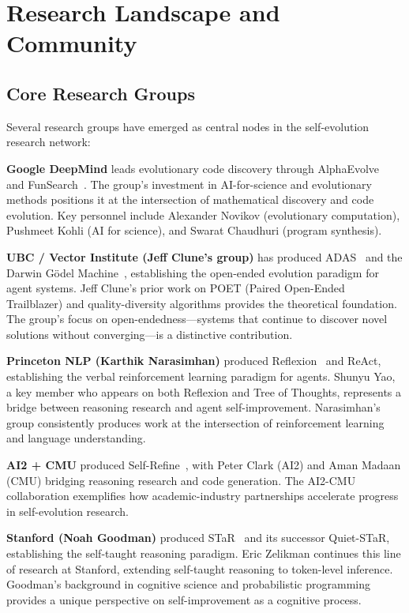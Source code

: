 \documentclass[11pt,a4paper]{article}
\begin{document}
\section{Research Landscape and Community}
\label{sec:landscape}

\subsection{Core Research Groups}

Several research groups have emerged as central nodes in the self-evolution research network:

\textbf{Google DeepMind} leads evolutionary code discovery through AlphaEvolve~\citep{novikov2025alphaevolve} and FunSearch~\citep{romera2024funsearch}. The group's investment in AI-for-science and evolutionary methods positions it at the intersection of mathematical discovery and code evolution. Key personnel include Alexander Novikov (evolutionary computation), Pushmeet Kohli (AI for science), and Swarat Chaudhuri (program synthesis).

\textbf{UBC / Vector Institute (Jeff Clune's group)} has produced ADAS~\citep{hu2024adas} and the Darwin G\"{o}del Machine~\citep{zhang2025dgm}, establishing the open-ended evolution paradigm for agent systems. Jeff Clune's prior work on POET (Paired Open-Ended Trailblazer) and quality-diversity algorithms provides the theoretical foundation. The group's focus on open-endedness---systems that continue to discover novel solutions without converging---is a distinctive contribution.

\textbf{Princeton NLP (Karthik Narasimhan)} produced Reflexion~\citep{shinn2023reflexion} and ReAct, establishing the verbal reinforcement learning paradigm for agents. Shunyu Yao, a key member who appears on both Reflexion and Tree of Thoughts, represents a bridge between reasoning research and agent self-improvement. Narasimhan's group consistently produces work at the intersection of reinforcement learning and language understanding.

\textbf{AI2 + CMU} produced Self-Refine~\citep{madaan2023selfrefine}, with Peter Clark (AI2) and Aman Madaan (CMU) bridging reasoning research and code generation. The AI2-CMU collaboration exemplifies how academic-industry partnerships accelerate progress in self-evolution research.

\textbf{Stanford (Noah Goodman)} produced STaR~\citep{zelikman2022star} and its successor Quiet-STaR, establishing the self-taught reasoning paradigm. Eric Zelikman continues this line of research at Stanford, extending self-taught reasoning to token-level inference. Goodman's background in cognitive science and probabilistic programming provides a unique perspective on self-improvement as a cognitive process.
\end{document}
